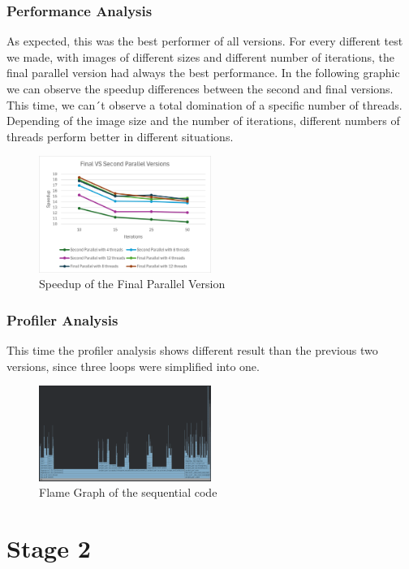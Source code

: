 \documentclass[sigconf]{acmart}
\begin{document}
\subsubsection{Performance Analysis}
As expected, this was the best performer of all versions. For every different test we made, with images of different sizes and different number of iterations, the final parallel version had always the best performance. In the following graphic we can observe the speedup differences between the second and final versions. This time, we can´t observe a total domination of a specific number of threads. Depending of the image size and the number of iterations, different numbers of threads perform better in different situations.
\begin{figure}[h]
    \centering
    \includegraphics[width=0.5\textwidth]{FinalParallelVersion.png}
    \caption{Speedup of the Final Parallel Version}
\end{figure}

\subsubsection{Profiler Analysis}
This time the profiler analysis shows different result than the previous two versions, since three loops were simplified into one.
\begin{figure}[h]
    \centering
    \includegraphics[width=0.5\textwidth]{FinalParallelProfiler.png}
    \caption{Flame Graph of the sequential code}
\end{figure}
\section{Stage 2}
\end{document}
